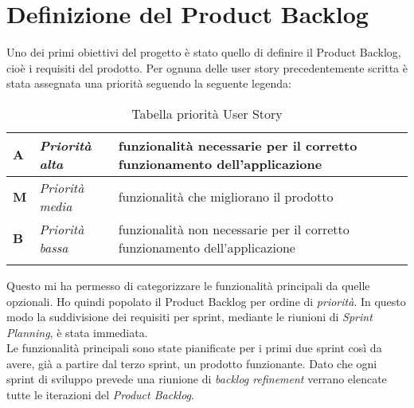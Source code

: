 \section{Definizione del Product Backlog}
Uno dei primi obiettivi del progetto è stato quello di definire il Product Backlog, cioè i requisiti del prodotto. Per ognuna delle user story precedentemente scritta è stata assegnata una priorità seguendo la seguente legenda:
\begin{longtable} {
		|>{\centering}p{10mm}| 
		|>{}p{25mm}|
		|>{}p{85mm}|
		>{}p{0mm}}
	\hline
	\textbf{A} & \textit{Priorità alta}  & funzionalità necessarie per il corretto funzionamento dell'applicazione \\ \hline
	\textbf{M} & \textit{Priorità media} & funzionalità che migliorano il prodotto \\ \hline
	\textbf{B} & \textit{Priorità bassa} & funzionalità non necessarie per il corretto funzionamento dell'applicazione \\ \hline
	\hline
	\caption{Tabella priorità User Story}
\end{longtable}
\noindent
Questo mi ha permesso di categorizzare le funzionalità principali da quelle opzionali. Ho quindi popolato il Product Backlog per ordine di \textit{priorità}. In questo modo la suddivisione dei requisiti per sprint, mediante le riunioni di \textit{Sprint Planning}, è stata immediata. \\
Le funzionalità principali sono state pianificate per i primi due sprint così da avere, già a partire dal terzo sprint, un prodotto funzionante. Dato che ogni sprint di sviluppo prevede una riunione di \emph{backlog refinement} verrano elencate tutte le iterazioni del \emph{Product Backlog}.

